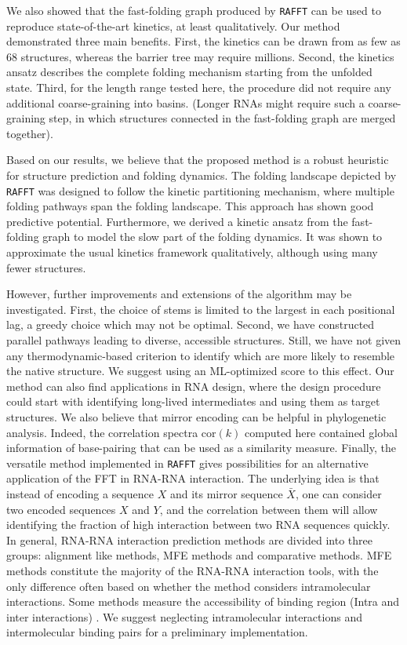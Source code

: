 We also showed that the fast-folding graph produced by \texttt{RAFFT} can be used to reproduce state-of-the-art kinetics, at least qualitatively. Our method demonstrated three main benefits. First, the kinetics can be drawn from as few as $68$ structures, whereas the barrier tree may require millions. Second, the kinetics ansatz describes the complete folding mechanism starting from the unfolded state. Third, for the length range tested here, the procedure did not require any additional coarse-graining into basins. (Longer RNAs might require such a coarse-graining step, in which structures connected in the fast-folding graph are merged together).

Based on our results, we believe that the proposed method is a robust heuristic for structure prediction and folding dynamics. The folding landscape depicted by \texttt{RAFFT} was designed to follow the kinetic partitioning mechanism, where multiple folding pathways span the folding landscape. This approach has shown good predictive potential. Furthermore, we derived a kinetic ansatz from the fast-folding graph to model the slow part of the folding dynamics. It was shown to approximate the usual kinetics framework qualitatively, although using many fewer structures. 

However, further improvements and extensions of the algorithm may be investigated. First, the choice of stems is limited to the largest in each positional lag, a greedy choice which may not be optimal. Second, we have constructed parallel pathways leading to diverse, accessible structures. Still, we have not given any thermodynamic-based criterion to identify which are more likely to resemble the native structure. We suggest using an ML-optimized score to this effect. Our method can also find applications in RNA design, where the design procedure could start with identifying long-lived intermediates and using them as target structures. We also believe that mirror encoding can be helpful in phylogenetic analysis. Indeed, the correlation spectra \(\text{cor}(k)\) computed here contained global information of base-pairing that can be used as a similarity measure. Finally, the versatile method implemented in \texttt{RAFFT} gives possibilities for an alternative application of the FFT in RNA-RNA interaction. The underlying idea is that instead of encoding a sequence $X$ and its mirror sequence $\bar{X}$, one can consider two encoded sequences $X$ and $Y$, and the correlation between them will allow identifying the fraction of high interaction between two RNA sequences quickly. In general, RNA-RNA interaction prediction methods are divided into three groups: alignment like methods, MFE methods and comparative methods. MFE methods constitute the majority of the RNA-RNA interaction tools, with the only difference often based on whether the method considers intramolecular interactions. Some methods measure the accessibility of binding region (Intra and inter interactions) \cite{umu2017comprehensive, dieterich2013computational, backofen2010computational}. We suggest neglecting intramolecular interactions and intermolecular binding pairs for a preliminary implementation. 

